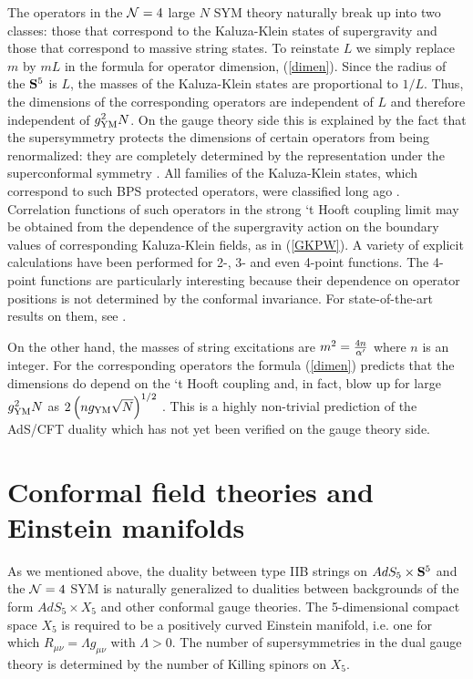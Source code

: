 \documentclass[12pt]{article}
\begin{document}
The operators in the ${\cal N}=4$ large $N$ SYM theory
naturally break up into two classes: those that correspond to the
Kaluza-Klein states of supergravity and those that correspond to 
massive string states.
To reinstate
$L$ we simply replace $m$ by $mL$ in the formula for
operator dimension, (\ref{dimen}). Since the radius of the ${\bf S}^5$
is $L$, the masses of the Kaluza-Klein states are
proportional to $1/L$. Thus,
the dimensions of the corresponding operators are independent of $L$ and
therefore independent of $g_{\rm YM}^2 N$.
On the gauge theory side this
is explained by the fact that the supersymmetry protects the dimensions
of certain operators from being renormalized: they are completely determined
by the representation under the superconformal symmetry 
\cite{hw,Ferrara}.
All families of the Kaluza-Klein states, which correspond to such
BPS protected operators, were classified long ago \cite{Kim}.
Correlation functions of such operators in the strong `t Hooft coupling
limit may be obtained from the dependence of the supergravity action
on the boundary values of corresponding Kaluza-Klein fields, as in
(\ref{GKPW}). A variety of explicit calculations have been performed for
2-, 3- and even 4-point functions. The 4-point functions are
particularly interesting because their dependence on operator positions
is not determined by the conformal invariance. For state-of-the-art
results on them, see \cite{DFM,Arut}.

On the other hand, the masses of string excitations are
$m^2 = {4 n\over \alpha'}$ where $n$ is an integer.
For the corresponding operators the formula (\ref{dimen})
predicts that the dimensions do depend on the `t Hooft coupling and,
in fact, blow up for large $g_{\rm YM}^2 N$ as
$2\left (n g_{\rm YM} \sqrt {N} \right )^{1/2}$ \cite{US}.
This is a highly non-trivial prediction of the AdS/CFT duality which
has not yet been verified on the gauge theory side.


\section{Conformal field theories and Einstein manifolds}

As we mentioned above, the duality between 
type IIB strings on $AdS_5\times {\bf S}^5$
and the ${\cal N}=4$ SYM is naturally generalized to dualities between
backgrounds of the form  $AdS_5\times X_5$ and other conformal gauge theories.
The 5-dimensional compact space $X_5$ is required to be a
positively curved Einstein manifold, i.e. one for which
$R_{\mu\nu}= \Lambda g_{\mu\nu}$ with $\Lambda>0$.
The number of supersymmetries in the dual gauge theory is determined
by the number of Killing spinors on $X_5$.
\end{document}
